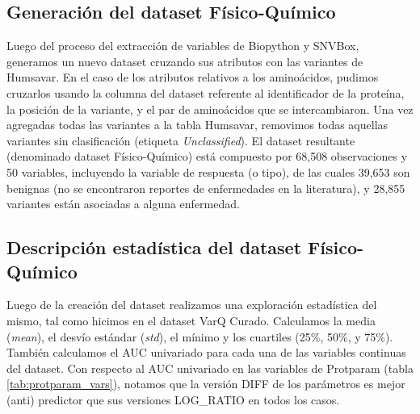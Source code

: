 \subsection{Generación del dataset Físico-Químico}

Luego del proceso del extracción de variables de Biopython y SNVBox, generamos un nuevo dataset cruzando sus atributos con las variantes de Humsavar. En el caso de los atributos relativos a los aminoácidos, pudimos cruzarlos usando la columna del dataset referente al identificador de la proteína, la posición de la variante, y el par de aminoácidos que se intercambiaron. Una vez agregadas todas las variantes a la tabla Humsavar, removimos todas aquellas variantes sin clasificación (etiqueta \textit{Unclassified}). El dataset resultante (denominado dataset Físico-Químico) está compuesto por 68,508 observaciones y 50 variables, incluyendo la variable de respuesta (o tipo), de las cuales 39,653 son benignas (no se encontraron reportes de enfermedades en la literatura), y 28,855 variantes están asociadas a alguna enfermedad. 

\subsection{Descripción estadística del dataset Físico-Químico}

Luego de la creación del dataset realizamos una exploración estadística del mismo, tal como hicimos en el dataset VarQ Curado. Calculamos la media (\textit{mean}), el desvío estándar (\textit{std}), el mínimo y los cuartiles (25\%, 50\%, y 75\%). También calculamos el AUC univariado para cada una de las variables continuas del dataset. Con respecto al AUC univariado en las variables de Protparam (tabla \ref{tab:protparam_vars}), notamos que la versión DIFF de los parámetros es mejor (anti) predictor que sus versiones LOG\_RATIO en todos los casos.


